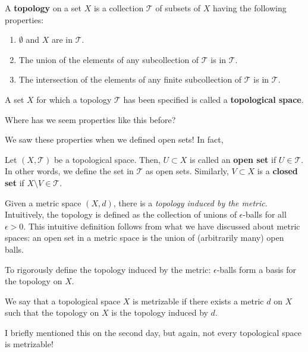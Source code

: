 \begin{definition}[Topology]
    A \textbf{topology} on a set $X$ is a collection $\mathcal T$ of subsets of $X$ having the following properties:
\begin{enumerate}
    \item $\emptyset$ and $X$ are in $\mathcal T$.
    \item The union of the elements of any subcollection of $\mathcal T$ is in $\mathcal T$.
    \item The intersection of the elements of any finite subcollection of $\mathcal T$ is in $\mathcal T$.
\end{enumerate}
    A set $X$ for which a topology $\mathcal T$ has been specified is called a \textbf{topological space}.
\end{definition}

\begin{question}
Where has we seem properties like this before?
\end{question}

We saw these properties when we defined open sets! In fact, 
\begin{definition}
Let $(X, \mathcal T)$ be a topological space. Then, $U\subset X$ is called an \textbf{open set} if $U \in \mathcal T$. In other words, we define the set in $\mathcal T$ as open sets. Similarly, $V\subset X$ is a \textbf{closed set} if $X\setminus V \in \mathcal T$.
\end{definition}
Given a metric space $(X,d)$, there is a \textit{topology induced by the metric}. Intuitively, the topology is defined as the collection of unions of $\epsilon$-balls for all $\epsilon >0$. This intuitive definition follows from what we have discussed about metric spaces: an open set in a metric space is the union of (arbitrarily many) open balls.

\begin{remark}
To rigorously define the topology induced by the metric: $\epsilon$-balls form a basis for the topology on $X$.
\end{remark}

\begin{definition}[Metrizable]
    We say that a topological space $X$ is metrizable if there exists a metric $d$ on $X$ such that the topology on $X$ is the topology induced by $d$.
\end{definition}

\begin{remark}
    I briefly mentioned this on the second day, but again, not every topological space is metrizable!
\end{remark}

